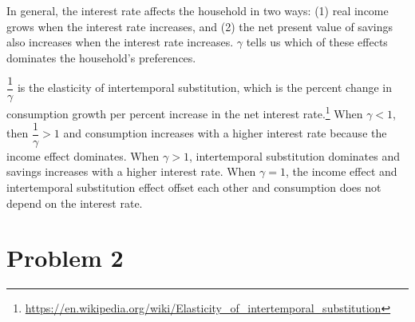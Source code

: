 \documentclass[12pt]{article}
\begin{document}
In general, the interest rate affects the household in two ways: (1) real income grows when the interest rate increases, and (2) the net present value of savings also increases when the interest rate increases. $\gamma$ tells us which of these effects dominates the household's preferences.  

$\dfrac{1}{\gamma}$ is the elasticity of intertemporal substitution, which is the percent change in consumption growth per percent increase in the net interest rate.\footnote{\url{https://en.wikipedia.org/wiki/Elasticity_of_intertemporal_substitution}} When $\gamma<1$, then $\dfrac{1}{\gamma}>1$ and consumption increases with a higher interest rate because the income effect dominates. When $\gamma>1$, intertemporal substitution dominates and savings increases with a higher interest rate. When $\gamma=1$, the income effect and intertemporal substitution effect offset each other and consumption does not depend on the interest rate.














\newpage
\section*{Problem 2}
\end{document}
